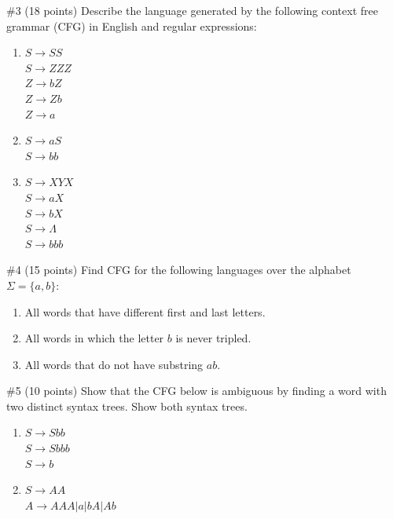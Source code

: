 \begin{problem}{\#3 (18 points)}
    Describe the language generated by the following context free grammar (CFG) in English and regular expressions:
    \begin{enumerate}[label=\alph*)]
        \item $S \rightarrow SS$\\
        $S \rightarrow ZZZ$\\
        $Z \rightarrow bZ$\\
        $Z \rightarrow Zb$\\
        $Z \rightarrow a$
        \item $S \rightarrow aS$\\
        $S \rightarrow bb$
        \item $S \rightarrow XYX$\\
        $S \rightarrow aX$\\
        $S \rightarrow bX$\\
        $S \rightarrow \Lambda$\\
        $S \rightarrow bbb$
    \end{enumerate}
\end{problem}
\begin{solution}
    
\end{solution}

\begin{problem}{\#4 (15 points)}
    Find CFG for the following languages over the alphabet $\Sigma = \{a,b\}$:
    \begin{enumerate}[label=\alph*)]
        \item All words that have different first and last letters.
        \item All words in which the letter $b$ is never tripled.
        \item All words that do not have substring $ab$.
    \end{enumerate}
\end{problem}
\begin{solution}
    
\end{solution}

\begin{problem}{\#5 (10 points)}
    Show that the CFG below is ambiguous by finding a word with two distinct syntax trees.
    Show both syntax trees.
    \begin{enumerate}[label=\alph*)]
        \item $S \rightarrow Sbb$\\
        $S \rightarrow Sbbb$\\
        $S \rightarrow b$\\
        \item $S \rightarrow AA$\\
        $A \rightarrow AAA|a|bA|Ab$
    \end{enumerate}
\end{problem}
\begin{solution}
    
\end{solution}
